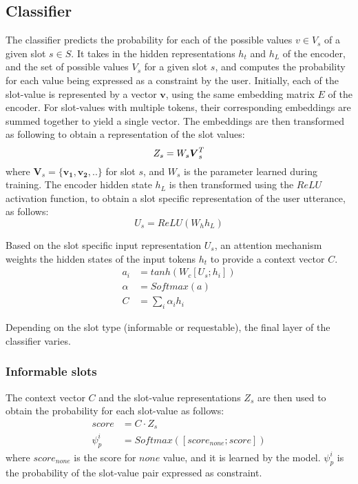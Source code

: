 \documentclass{article}
\begin{document}
\subsection{Classifier}
The classifier predicts the probability for each of the possible values $v \in V_s$  of a given slot $s \in S$.
It takes in the hidden representations $h_t$ and $h_L$ of the encoder, and the set of possible values $V_s$ for a given slot $s$, and computes the probability for each value being expressed as a constraint by the user.
Initially, each of the slot-value is represented by a vector $\boldsymbol{v}$, using the same embedding matrix $E$ of the encoder.
For slot-values with multiple tokens, their corresponding embeddings are summed together to yield a single vector.
The embeddings are then transformed as following to obtain a representation of the slot values:
\begin{equation}
    Z_s = W_s\boldsymbol{V}_s^T \\
\end{equation}
where $\boldsymbol{V}_s = \{\boldsymbol{v_1}, \boldsymbol{v_2},..\}$ for slot $s$, and $W_s$ is the parameter learned during training.
The encoder hidden state $h_L$ is then transformed using the $ReLU$ activation function, to obtain a slot specific representation of the user utterance, as follows:
\begin{equation}
    U_s = ReLU(W_hh_L)
\end{equation}

Based on the slot specific input representation $U_s$, an attention mechanism weights the hidden states of the input tokens $h_t$ to provide a context vector $C$.
\begin{align}
    a_i &= tanh(W_c[U_s;h_i]) \\
    \alpha &= Softmax(a) \\
    C &= \sum_i \alpha_ih_i
\end{align}

Depending on the slot type (informable or requestable), the final layer of the classifier varies.

\subsubsection{Informable slots}
The context vector $C$ and the slot-value representations $Z_s$ are then used to obtain the probability for each slot-value as follows:
\begin{align}
    score &= C \cdot Z_s \\
    \psi_p^i &= Softmax([score_{none}; score])
\end{align}
where $score_{none}$ is the score for $none$ value, and it is learned by the model. $\psi_p^i$ is the probability of the slot-value pair expressed as constraint.
\end{document}
